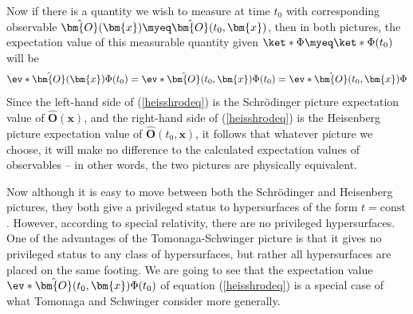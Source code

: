 \documentclass[12pt]{report}
\begin{document}
Now if there is a quantity we wish to measure at time $t_0$ with corresponding observable $\hat{\bm{O}}(\bm{x})\myeq\hat{\bm{O}}(t_0, \bm{x})$, then in both pictures, the expectation value of this measurable quantity given $\ket*{\Phi}\myeq\ket*{\Phi(t_0)}$ will be 
\begin{equation}\label{heisshrodeq}
  \ev*{\hat{\bm{O}}(\bm{x})}{\Phi(t_0)}=\ev*{\hat{\bm{O}}(t_0,\bm{x})}{\Phi(t_0)}=\ev*{\hat{\bm{O}}(t_0, \bm{x})}{\Phi}
\end{equation}
Since the left-hand side of (\ref{heisshrodeq}) is the Schr\"{o}dinger picture expectation value of $\hat{\bm{O}}(\bm{x})$, and the right-hand side of (\ref{heisshrodeq}) is the Heisenberg picture expectation value of $\hat{\bm{O}}(t_0,\bm{x})$, it follows that whatever picture we choose, it will make no difference to the calculated expectation values of observables -- in other words, the two pictures are physically equivalent.

Now although it is easy to move between both the Schr\"{o}dinger and Heisenberg pictures, they both give a privileged status to hypersurfaces of the form $t=\text{const}$. However, according to special relativity, there are no privileged hypersurfaces. One of the advantages of the Tomonaga-Schwinger picture is that it gives no privileged status to any class of hypersurfaces, but rather all hypersurfaces are placed on the same footing. We are going to see that the expectation value $\ev*{\hat{\bm{O}}(t_0,\bm{x})}{\Phi(t_0)}$  of equation (\ref{heisshrodeq}) is a special case of what Tomonaga and Schwinger consider more generally. 
\end{document}
